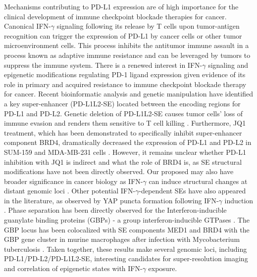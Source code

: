 Mechanisms contributing to PD-L1 expression are of high importance for the clinical development of immune checkpoint blockade therapies for cancer. Canonical IFN-$\gamma$ signaling following its release by T cells upon tumor-antigen recognition can trigger the expression of PD-L1 by cancer cells or other tumor microenvironment cells. This process inhibits the antitumor immune assault in a process known as adaptive immune resistance and can be leveraged by tumors to suppress the immune system. There is a renewed interest in IFN-$\gamma$ signaling and epigenetic modifications regulating PD-1 ligand expression given evidence of its role in primary and acquired resistance to immune checkpoint blockade therapy for cancer. Recent bioinformatic analysis and genetic manipulation have identified a key super-enhancer (PD-L1L2-SE) located between the encoding regions for PD-L1 and PD-L2. Genetic deletion of PD-L1L2-SE causes tumor cells’ loss of immune evasion and renders them sensitive to T cell killing \parencite{Xu2019}. Furthermore, JQ1 treatment, which has been demonstrated to specifically inhibit super-enhancer component BRD4, dramatically decreased the expression of PD-L1 and PD-L2 in SUM-159 and MDA-MB-231 cells \parencite{Xu2019}. However, it remains unclear whether PD-L1 inhibition with JQ1 is indirect and what the role of BRD4 is, as SE structural modifications have not been directly observed. Our proposed may also have broader significance in cancer biology as IFN-$\gamma$ can induce structural changes at distant genomic loci \parencite{Lin2022,Platinitis2022}. Other potential IFN-$\gamma$-dependent SEs have also appeared in the literature, as observed by YAP puncta formation following IFN-$\gamma$ induction \parencite{Yu2021}. Phase separation has been directly observed for the Interferon-inducible guanylate binding proteins (GBPs) - a group interferon-inducible GTPases \parencite{Siwek2020}. The GBP locus has been colocalized with SE components MED1 and BRD4 with the GBP gene cluster in murine macrophages after infection with Mycobacterium tuberculosis \parencite{Lin2022}. Taken together, these results make several genomic loci, including PD-L1/PD-L2/PD-L1L2-SE, interesting candidates for super-resolution imaging and correlation of epigenetic states with IFN-$\gamma$ exposure.

